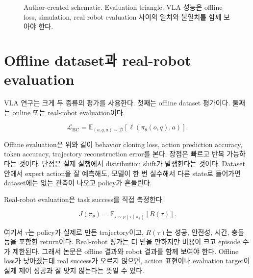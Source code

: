 \begin{figure}[t]
  \centering
  \caption{Author-created schematic. Evaluation triangle. VLA 성능은 offline loss, simulation, real robot evaluation 사이의 일치와 불일치를 함께 보아야 한다.}
  \label{fig:evaluation_triangle}
\end{figure}

\section{Offline dataset과 real-robot evaluation}

VLA 연구는 크게 두 종류의 평가를 사용한다. 첫째는 offline dataset 평가이다. 둘째는 online 또는 real-robot evaluation이다.

\begin{equation}
  \mathcal{L}_{\mathrm{BC}}
  =
  \mathbb{E}_{(o,q,a)\sim\mathcal{D}}
  \left[
    \ell
    \left(
      \pi_\theta(o,q),
      a
    \right)
  \right].
\end{equation}

Offline evaluation은 위와 같이 behavior cloning loss, action prediction accuracy, token accuracy, trajectory reconstruction error를 본다. 장점은 빠르고 반복 가능하다는 것이다. 단점은 실제 실행에서 distribution shift가 발생한다는 것이다. Dataset 안에서 expert action을 잘 예측해도, 모델이 한 번 실수해서 다른 state로 들어가면 dataset에는 없는 관측이 나오고 policy가 흔들린다.

Real-robot evaluation은 task success를 직접 측정한다.

\begin{equation}
  J(\pi_\theta)
  =
  \mathbb{E}_{\tau \sim p(\tau \mid \pi_\theta)}
  \left[
    R(\tau)
  \right].
\end{equation}

여기서 $\tau$는 policy가 실제로 만든 trajectory이고, $R(\tau)$는 성공, 안전성, 시간, 충돌 등을 포함한 return이다. Real-robot 평가는 더 믿을 만하지만 비용이 크고 episode 수가 제한된다. 그래서 논문은 offline 결과와 robot 결과를 함께 보여야 한다. Offline loss가 낮아졌는데 real success가 오르지 않으면, action 표현이나 evaluation target이 실제 제어 성공과 잘 맞지 않는다는 뜻일 수 있다.

